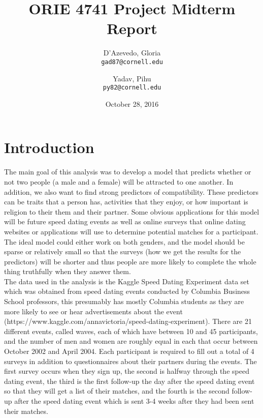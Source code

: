 \documentclass{article}
\title{ORIE 4741 Project Midterm Report}
\author{
  D'Azevedo, Gloria\\
  \texttt{gad87@cornell.edu}
  \and
  Yadav, Pihu\\
  \texttt{py82@cornell.edu}
}
\date{October 28, 2016}
\begin{document}
\maketitle



\section{Introduction}
The main goal of this analysis was to develop a model that predicts whether or not two people (a male and a female) will be attracted to one another.  In addition, we also want to find strong predictors of compatibility.  These predictors can be traits that a  person has, activities that they enjoy, or how important is religion to their them and their partner.  Some obvious applications for this model will be future speed dating events as well as online surveys that online dating websites or applications will use to determine potential matches for a participant. The ideal model could either work on both genders, and the model should be sparse or relatively small so that the surveys (how we get the results for the predictors) will be shorter and thus people are more likely to complete the whole thing truthfully when they answer them.\\

The data used in the analysis is the Kaggle Speed Dating Experiment data set which was obtained from speed dating events conducted by Columbia Business School professors, this presumably has mostly Columbia students as they are more likely to see or hear advertisements about the event (https://www.kaggle.com/annavictoria/speed-dating-experiment). There are 21 different events, called waves, each of which have between 10 and 45 participants, and the number of men and women are roughly equal in each that occur between October 2002 and April 2004.  Each participant is required to fill out a total of 4 surveys in addition to questionnaires about their partners during the events.  The first survey occurs when they sign up, the second is halfway through the speed dating event, the third is the first follow-up the day after the speed dating event so that they will get a list of their matches, and the fourth is the second follow-up after the speed dating event which is sent 3-4 weeks after they had been sent their matches. \\
\end{document}
